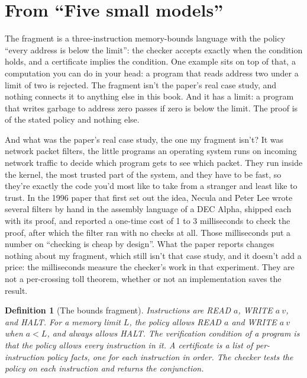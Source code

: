 \documentclass[11pt,twoside]{article}
\theoremstyle{thielethm}
\theoremstyle{thieledef}
\newtheorem{definition}{Definition}[section]
\theoremstyle{thieledef}
\theoremstyle{thieledef}
\theoremstyle{thielethm}
\theoremstyle{thieleobs}
\theoremstyle{thielethm}
\begin{document}
\section{From ``Five small models''}
The fragment is a three-instruction
memory-bounds language with the policy ``every address is below the limit'': the checker
accepts exactly when the condition holds, and a certificate implies the condition. One example
sits on top of that, a computation you can do in your head: a program that reads address two under a limit of two is rejected.
The fragment isn't the paper's real case study, and nothing connects it to anything else in this book. And it has a limit: a
program that writes garbage to address zero passes if zero
is below the limit. The proof is of the stated policy and nothing else.

And what was the paper's real case study, the one my fragment isn't? It was network packet filters, the
little programs an operating system runs on incoming network traffic to decide which program
gets to see which packet. They run inside the kernel, the most trusted part of the system, and
they have to be fast, so they're exactly the code you'd most like to take from a stranger and
least like to trust. In the 1996 paper that first set out the idea, Necula and Peter Lee wrote
several filters by hand in the assembly language of a DEC Alpha, shipped each with its proof,
and reported a one-time cost of 1 to 3 milliseconds to check the proof, after which the filter
ran with no checks at all. Those milliseconds put a number on ``checking is cheap by design''. What the paper reports changes
nothing about my fragment, which still isn't that case study, and it doesn't add a price: the
milliseconds measure the checker's work in that experiment. They are not
a per-crossing toll theorem, whether or not an implementation saves the result.

\begin{definition}[The bounds fragment]\label{def:u13-pcc}
Instructions are READ $a$, WRITE $a\ v$, and HALT. For a memory limit $L$, the policy allows
READ $a$ and WRITE $a\ v$ when $a < L$, and always allows HALT. The \emph{verification condition}
of a program is that the policy allows every instruction in it. A \emph{certificate} is a list of
per-instruction policy facts, one for each instruction in order. The \emph{checker} tests the
policy on each instruction and returns the conjunction.
\end{definition}
\end{document}
